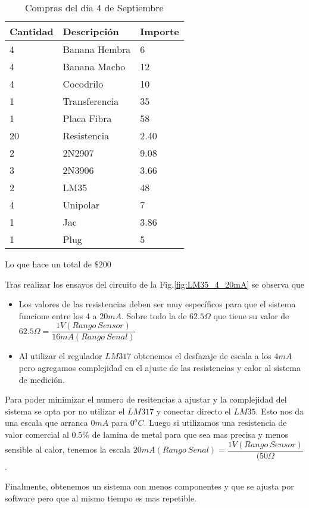 \begin{table}[H]
  \begin{tabular}{l l l}
    \toprule
    \textbf{Cantidad} & \textbf{Descripción} & \textbf{Importe} \\
    \toprule
    4 	& 	Banana Hembra 	& 	6\\
    4  & 	Banana Macho	& 	12\\
    4	&	Cocodrilo	&	10\\
    1	&	Transferencia	&	35\\
    1	&	Placa Fibra	&	58\\
    20	&	Resistencia	&	2.40\\
    2	&	2N2907		&	9.08\\
    3	&	2N3906		&	3.66\\
    2	&	LM35		&	48\\
    4	&	Unipolar	&	7\\
    1	&	Jac		&	3.86\\
    1	&	Plug		&	5\\
    \bottomrule
  \end{tabular}
  \caption{Compras del día 4 de Septiembre}
  \label{tab:compra}
\end{table}
Lo que hace un total de $\$200$


Tras realizar los ensayos del circuito de la Fig.\ref{fig:LM35_4_20mA} se observa que 
\begin{itemize}
 \item Los valores de las resistencias deben ser muy específicos para que el sistema funcione
 entre los $4$ a $20mA$. Sobre todo la de $62.5\Omega$ que tiene su valor de 
 $62.5\Omega=\dfrac{1V(Rango~Sensor)}{16mA(Rango~Senal)}$
 \item Al utilizar el regulador $LM317$ obtenemos el desfazaje de escala a los $4mA$ pero 
 agregamos complejidad en el ajuste de las resistencias y calor al sistema de medición.
\end{itemize}

Para poder minimizar el numero de resitencias a ajustar y la complejidad del sistema se 
opta por no utilizar el $LM317$ y conectar directo el $LM35$. Esto nos da una escala que 
arranca $0mA$ para $0^oC$. Luego si utilizamos una resistencia de valor comercial al $0.5\%$
de lamina de metal para que sea mas precisa y menos sensible al calor, tenemos la escala 
$20mA(Rango~Senal)=\dfrac{1V(Rango~Sensor)}{(50\Omega}$.

Finalmente, obtenemos un sistema con menos componentes y que se ajusta por software pero 
que al mismo tiempo es mas repetible. 


